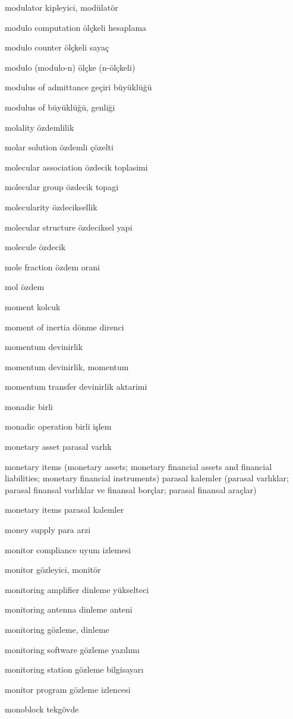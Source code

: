 \documentclass[12pt,fleqn]{article}\usepackage{../../common}
\begin{document}
modulator kipleyici, modülatör

modulo computation ölçkeli hesaplama

modulo counter ölçkeli sayaç

modulo (modulo-n) ölçke (n-ölçkeli)

modulus of admittance geçiri büyüklüğü

modulus of büyüklüğü, genliği

molality özdemlilik

molar solution özdemli çözelti

molecular association özdecik toplasimi

molecular group özdecik topagi

molecularity özdeciksellik

molecular structure özdeciksel yapi

molecule özdecik

mole fraction özdem orani

mol özdem

moment kolcuk

moment of inertia dönme direnci

momentum devinirlik

momentum devinirlik, momentum

momentum transfer devinirlik aktarimi

monadic birli

monadic operation birli işlem

monetary asset parasal varlık

monetary items (monetary assets; monetary financial assets and financial liabilities; monetary financial instruments) parasal kalemler (parasal varlıklar; parasal finansal varlıklar ve finansal borçlar; parasal finansal araçlar)

monetary items parasal kalemler

money supply para arzi

monitor compliance uyum izlemesi

monitor gözleyici, monitör

monitoring amplifier dinleme yükselteci

monitoring antenna dinleme anteni

monitoring gözleme, dinleme

monitoring software gözleme yazılımı

monitoring station gözleme bilgisayarı

monitor program gözleme izlencesi

monoblock tekgövde
\end{document}
